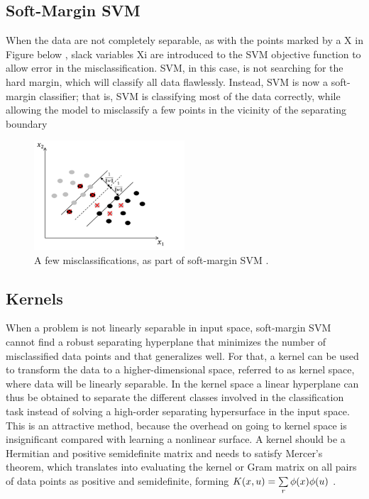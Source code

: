 \subsection{Soft-Margin SVM}

When the data are not completely separable, as with the points marked by a X in Figure below  , slack variables Xi  are introduced to the SVM objective function to allow error in the misclassification. SVM, in this case, is not searching for the hard margin, which will classify all data flawlessly. Instead, SVM is now a soft-margin classifier; that is, SVM is classifying most of the data correctly, while allowing the model to misclassify a few points in the vicinity of the separating boundary

\begin{figure}[H]
\centering
\includegraphics[width=0.5\textwidth]{img/softmargin.PNG}
\caption{  A few misclassifications, as part of soft-margin SVM . }
\label{126 }
\end{figure}


\subsection{Kernels}

When a problem is not linearly separable in input space, soft-margin SVM cannot find a robust separating
hyperplane that minimizes the number of misclassified data points and that generalizes well. For that, a kernel can be used to transform the data to a higher-dimensional space, referred to as kernel space, where data will be linearly separable. In the kernel space a linear hyperplane can thus be obtained to separate the different classes involved in the classification task instead of solving a high-order separating hypersurface in the input space. This is an attractive method, because the overhead on going to kernel space is insignificant compared with learning a nonlinear surface. A kernel should be a Hermitian and positive semidefinite matrix and needs to satisfy Mercer’s theorem, which translates into evaluating the kernel or Gram matrix on all pairs of data points as positive and semidefinite, forming
\newline 
\newline
$K(\small{x,u})=\sum\limits_{r} \phi(x)\phi(u) $ .

